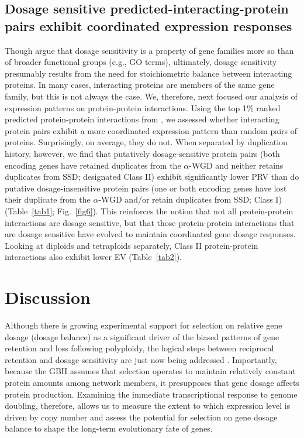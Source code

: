 \documentclass[11pt]{article}
\begin{document}
\subsection*{Dosage sensitive predicted-interacting-protein pairs exhibit coordinated expression responses}
Though \cite{tasdighian2017} argue that dosage sensitivity is a property of gene families more so than of broader functional groups (e.g., GO terms), ultimately, dosage sensitivity presumably results from the need for stoichiometric balance between interacting proteins.
In many cases, interacting proteins are members of the same gene family, but this is not always the case.
We, therefore, next focused our analysis of expression patterns on protein-protein interactions.
Using the top 1\% ranked predicted protein-protein interactions from \cite{dong2019}, we assessed whether interacting protein pairs exhibit a more coordinated expression pattern than random pairs of proteins.
Surprisingly, on average, they do not.
When separated by duplication history, however, we find that putatively dosage-sensitive protein pairs (both encoding genes have retained duplicates from the $\alpha$-WGD and neither retains duplicates from SSD; designated Class II) exhibit significantly lower PRV than do putative dosage-insensitive protein pairs (one or both encoding genes have lost their duplicate from the $\alpha$-WGD and/or retain duplicates from SSD; Class I) (Table~\ref{tab1}; Fig.~\ref{fig6}).
This reinforces the notion that not all protein-protein interactions are dosage sensitive, but that those protein-protein interactions that are dosage sensitive have evolved to maintain coordinated gene dosage responses.
Looking at diploids and tetraploids separately, Class II protein-protein interactions also exhibit lower EV (Table~\ref{tab2}).\\

\section*{Discussion}
Although there is growing experimental support for selection on relative gene dosage (dosage balance) as a significant driver of the biased patterns of gene retention and loss following polyploidy, the logical steps between reciprocal retention and dosage sensitivity are just now being addressed \citep{tasdighian2017, coate2016}.
Importantly, because the GBH assumes that selection operates to maintain relatively constant protein amounts among network members, it presupposes that gene dosage affects protein production.
Examining the immediate transcriptional response to genome doubling, therefore, allows us to measure the extent to which expression level is driven by copy number and assess the potential for selection on gene dosage balance to shape the long-term evolutionary fate of genes.\\
\end{document}
